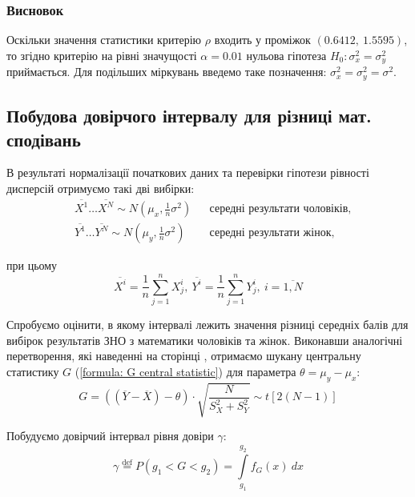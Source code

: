 \subsubsection{Висновок}
\label{page: MATH dispersion hypothesis}

Оскільки значення статистики критерію $\rho$ входить у проміжок $(0.6412,\ 1.5595)$, то згідно критерію 
на рівні значущості $\alpha=0.01$ нульова гіпотеза $H_0: \sigma_x^2=\sigma_y^2$ приймається. 
Для подільших міркувань введемо таке позначення: $\sigma_x^2=\sigma_y^2=\sigma^2$.

\newpage
\subsection*{Побудова довірчого інтервалу для різниці мат. сподівань}

В результаті нормалізації початкових даних та перевірки гіпотези рівності дисперсій отримуємо такі дві вибірки: 
\begin{align}
    &\overline{X^1}\ldots \overline{X^N}\sim N(\mu_x,\tfrac{1}{n}\sigma^2) && \text{середні результати чоловіків,} \label{formula: MATH ND X} \\
    &\overline{Y^1}\ldots \overline{Y^N}\sim N(\mu_y,\tfrac{1}{n}\sigma^2) && \text{середні результати жінок,} \label{formula: MATH ND Y}
\end{align}

при цьому
\[ \overline{X^i}=\frac{1}{n}\sum\limits_{j=1}^nX^i_j,\ 
   \overline{Y^i}=\frac{1}{n}\sum\limits_{j=1}^nY^i_j,\ i=\overline{1,N} \]

Спробуємо оцінити, в якому інтервалі лежить значення різниці середніх балів для вибірок результатів ЗНО з 
математики чоловіків та жінок. Виконавши аналогічні перетворення, які наведенні на сторінці \pageref{page: seaching central statistic}, 
отримаємо шукану центральну статистику $G$ (\ref{formula: G central statistic}) для параметра $\theta=\mu_y-\mu_x:$
\begin{equation*}
    G=\left( (\overline{Y}-\overline{X})-\theta \right)\cdot \sqrt{\frac{N}{S_X^2+S_Y^2}}
    \sim t\left[ 2(N-1) \right]
\end{equation*}

Побудуємо довірчий інтервал рівня довіри $\gamma:$
\begin{equation*}
    \gamma \overset{\mathrm{def}}{=}P(g_1<G<g_2)=\int\limits_{g_1}^{g_2}f_G(x)\ dx
\end{equation*}

